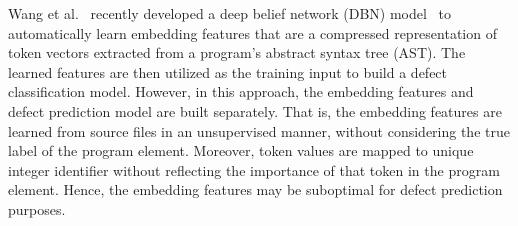 
Wang et al.~\cite{wang2016automatically} recently developed a deep belief network (DBN) model~\cite{hinton2009deep} to automatically learn embedding features that are a compressed representation of token vectors extracted from a program's abstract syntax tree (AST). The learned features are then utilized as the training input to build a defect classification model. However, in this approach, the embedding features and defect prediction model are built separately.
That is, the embedding features are learned from source files in an unsupervised manner, without considering the true label of the program element. Moreover, token values are mapped to unique integer identifier without reflecting the importance of that token in the program element. Hence, the embedding features may be suboptimal for defect prediction purposes. 

